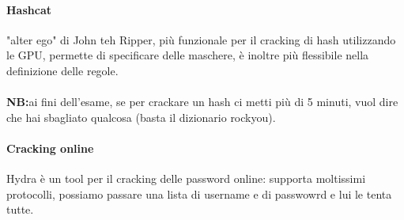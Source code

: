 \documentclass{article}
\begin{document}
\paragraph{Hashcat}"alter ego" di John teh Ripper, più funzionale per il cracking di hash utilizzando le GPU, permette di specificare delle maschere, è inoltre più flessibile nella definizione delle regole.
\\\\ \textbf{NB:}ai fini dell'esame, se per crackare un hash ci metti più di 5 minuti, vuol dire che hai sbagliato qualcosa (basta il dizionario rockyou).
\paragraph{Cracking online}Hydra è un tool per il cracking delle password online: supporta moltissimi protocolli, possiamo passare una lista di username e di passwowrd e lui le tenta tutte.
\end{document}
